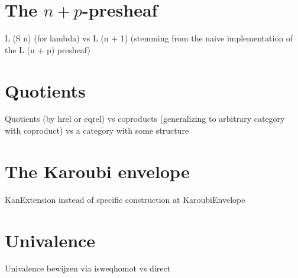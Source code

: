 \section{The \texorpdfstring{$ n + p $}{n + p}-presheaf}
L (S n) (for lambda) vs L (n + 1) (stemming from the naive implementation of the L (n + p) presheaf)

\section{Quotients}
Quotients (by hrel or eqrel) vs coproducts (generalizing to arbitrary category with coproduct) vs a category with some structure

\section{The Karoubi envelope}
KanExtension instead of specific construction at KaroubiEnvelope

\section{Univalence}
Univalence bewijzen via isweqhomot vs direct

